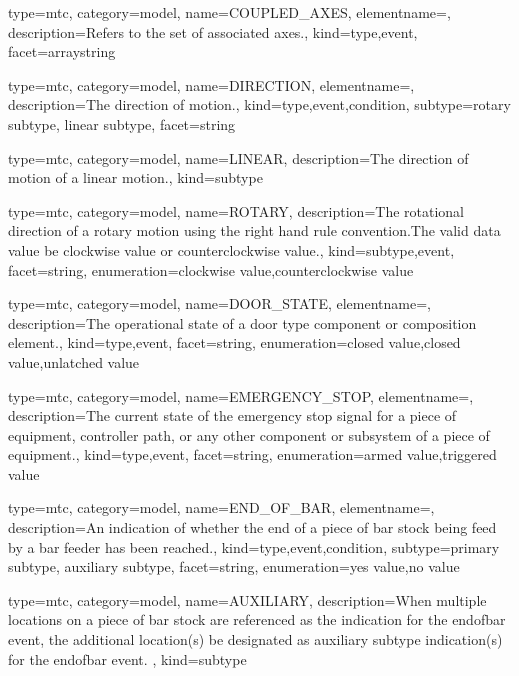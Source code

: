 {
  type=mtc,
  category=model,
  name={COUPLED\_AXES},
  elementname=,
  description={Refers to the set of associated axes.},
  kind={type,event},
  facet={\gls{arraystring}}
}


{
  type=mtc,
  category=model,
  name={DIRECTION},
  elementname=,
  description={The direction of motion.},
  kind={type,event,condition},
  subtype={\gls{rotary subtype}, \gls{linear subtype}},
  facet={\gls{string}}
}


{
  type=mtc,
  category=model,
  name={LINEAR},
  description={The direction of motion of a linear motion.},
  kind={subtype}
}


{
  type=mtc,
  category=model,
  name={ROTARY},
  description={The rotational direction of a rotary motion using the right hand rule convention.The \gls{valid data value} \must be \gls{clockwise value} or \gls{counterclockwise value}.},
  kind={subtype,event},
  facet={\gls{string}},
  enumeration={\gls{clockwise value},\gls{counterclockwise value}}
}


{
  type=mtc,
  category=model,
  name={DOOR\_STATE},
  elementname=,
  description={The operational state of a \gls{door} type component or composition element.},
  kind={type,event},
  facet={\gls{string}},
  enumeration={\gls{closed value},\gls{closed value},\gls{unlatched value}}
}


{
  type=mtc,
  category=model,
  name={EMERGENCY\_STOP},
  elementname=,
  description={The current state of the emergency stop signal for a piece of equipment, controller path, or any other component or subsystem of a piece of equipment.},
  kind={type,event},
  facet={\gls{string}},
  enumeration={\gls{armed value},\gls{triggered value}}
}


{
  type=mtc,
  category=model,
  name={END\_OF\_BAR},
  elementname=,
  description={An indication of whether the end of a piece of bar stock being feed by a bar feeder has been reached.},
  kind={type,event,condition},
  subtype={\gls{primary subtype}, \gls{auxiliary subtype}},
  facet={\gls{string}},
  enumeration={\gls{yes value},\gls{no value}}
}


{
  type=mtc,
  category=model,
  name={AUXILIARY},
  description={When multiple locations on a piece of bar stock are referenced as the indication for the \gls{endofbar event}, the additional location(s) \must be designated as \gls{auxiliary subtype} indication(s) for the \gls{endofbar event}.  },
  kind={subtype}
}


